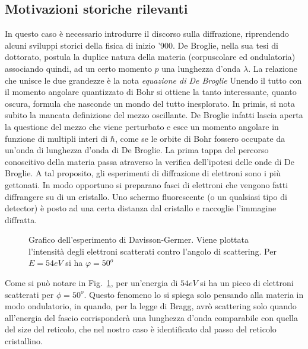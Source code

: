 \documentclass[a4paper,12pt]{article}
\begin{document}
\subsection{Motivazioni storiche rilevanti}
In questo caso è necessario introdurre il discorso sulla diffrazione, riprendendo alcuni sviluppi storici della fisica di inizio '900. De Broglie, nella sua tesi di dottorato, postula la duplice natura della materia (corpuscolare ed ondulatoria) associando quindi, ad un certo momento $p$ una lunghezza d'onda $\lambda$. La relazione che unisce le due grandezze è la nota \textit{equazione di De Broglie}
Unendo il tutto con il momento angolare quantizzato di Bohr si ottiene la tanto interessante, quanto oscura, formula
che nasconde un mondo del tutto inesplorato. In primis, si nota subito la mancata definizione del mezzo oscillante. De Broglie infatti lascia aperta la questione del mezzo che viene perturbato e esce un momento angolare in funzione di multipli interi di $\hbar$, come se le orbite di Bohr fossero occupate da un'onda di lunghezza d'onda di De Broglie. La prima tappa del percorso conoscitivo della materia passa atraverso la verifica dell'ipotesi delle onde di De Broglie. A tal proposito, gli esperimenti di diffrazione di elettroni sono i più gettonati. In modo opportuno si preparano fasci di elettroni che vengono fatti diffrangere su di un cristallo. Uno schermo fluorescente (o un qualsiasi tipo di detector) è posto ad una certa distanza dal cristallo e raccoglie l'immagine diffratta. 
\begin{figure}
	\centering
	\caption{Grafico dell'esperimento di Davisson-Germer. Viene plottata l'intensità degli elettroni scatterati contro l'angolo di scattering. Per $E=54eV$ si ha $\varphi=50^o$}
	\label{Davisson}
\end{figure}
Come si può notare in Fig.~\ref{Davisson}, per un'energia di $54eV$ si ha un picco di elettroni scatterati per $\phi=50^o$. Questo fenomeno lo si spiega solo pensando alla materia in modo ondulatorio, in quando, per la legge di Bragg, avrò scattering solo quando all'energia del fascio corrisponderà una lunghezza d'onda comparabile con quella del size del reticolo, che nel nostro caso è identificato dal passo del reticolo cristallino.
\end{document}
